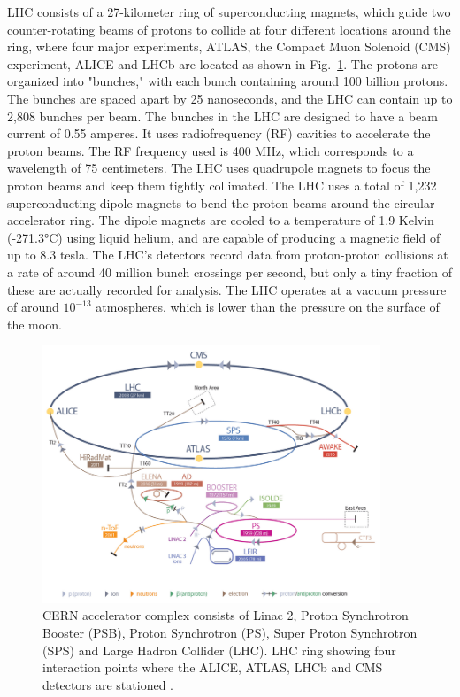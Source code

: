 LHC consists of a 27-kilometer ring of superconducting magnets, which guide two counter-rotating beams of protons to collide at four different locations around the ring, where four major experiments, ATLAS, the Compact Muon Solenoid (CMS) experiment, ALICE and LHCb are located as shown in Fig.~\ref{fig:lhc}. The protons are organized into "bunches," with each bunch containing around 100 billion protons. The bunches are spaced apart by 25 nanoseconds, and the LHC can contain up to 2,808 bunches per beam. The bunches in the LHC are designed to have a beam current of 0.55 amperes. It uses radiofrequency (RF) cavities to accelerate the proton beams. The RF frequency used is 400 MHz, which corresponds to a wavelength of 75 centimeters. The LHC uses quadrupole magnets to focus the proton beams and keep them tightly collimated. The LHC uses a total of 1,232 superconducting dipole magnets to bend the proton beams around the circular accelerator ring. The dipole magnets are cooled to a temperature of 1.9 Kelvin (-271.3°C) using liquid helium, and are capable of producing a magnetic field of up to 8.3 tesla. The LHC's detectors record data from proton-proton collisions at a rate of around 40 million bunch crossings per second, but only a tiny fraction of these are actually recorded for analysis. The LHC operates at a vacuum pressure of around $10^{-13}$ atmospheres, which is lower than the pressure on the surface of the moon.

\begin{figure}[!htp]
\centering
\includegraphics[width=0.9\textwidth]{ashish_thesis/lhc_schematic.png}
\caption[CERN Accelerator Complex]{%
    CERN accelerator complex consists of Linac 2, Proton Synchrotron Booster (PSB), Proton Synchrotron (PS), Super Proton Synchrotron (SPS) and Large Hadron Collider (LHC). LHC ring showing four interaction points where the ALICE, ATLAS, LHCb and CMS detectors are stationed \cite{lhc_complex}.
}
\label{fig:lhc}
\end{figure}

